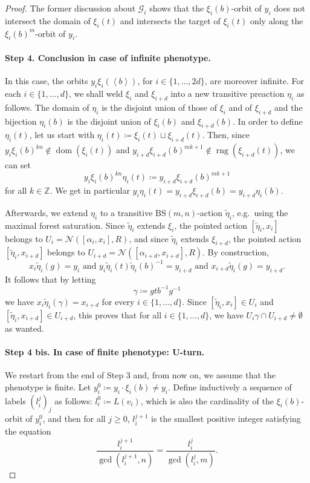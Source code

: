 \documentclass[12pt]{article}
\numberwithin{equation}{section}
\theoremstyle{definition}
\DeclareMathOperator{\dom}{\mathrm{dom}}
\DeclareMathOperator{\rng}{\mathrm{rng}}
\newcommand{\Z}{\mathbb{Z}}
\newcommand{\inv}{^{-1}}
\newcommand{\la}{\left\langle}
\newcommand{\ra}{\right\rangle}
\newcommand{\Gc}{\mathcal{G}}
\newcommand{\Nc}{\mathcal{N}}
\newcommand\BSo{\mathrm{BS}}
\begin{document}
\begin{proof}
    The former discussion about $\Gc_i$ shows that
    the $\xi_i(b)$-orbit of $y_i$ does not intersect the domain of $\xi_i(t)$ 
    and intersects the target of $\xi_i(t)$ only along the $\xi_i(b)^{m}$-orbit of $y_i$.
	
	\paragraph{Step 4. Conclusion in case of infinite phenotype.}
	
	In this case, the orbits $y_i \xi_i(\la b \ra)$, for $i\in \{1, \ldots, 2d\}$, are moreover infinite.
	For each $i\in \{1, \ldots, d\}$,
	we shall weld $\xi_i$ and $\xi_{i+d}$ into a new transitive preaction $\eta_i$ as follows.
	The domain of $\eta_i$ is the disjoint union of those of $\xi_i$ and of $\xi_{i+d}$ and
	the bijection $\eta_i(b)$ is the disjoint union of $\xi_i(b)$ and $\xi_{i+d}(b)$.
	In order to define $\eta_i(t)$, let us start with $\eta_i(t) \coloneqq \xi_{i}(t) \sqcup \xi_{i+d}(t)$.
	Then, since $y_i\xi_i(b)^{kn}\notin \dom(\xi_i(t))$ and $y_{i+d}\xi_{i+d}(b)^{mk+1} \notin \rng(\xi_{i+d}(t))$, we can set
	\[
	    y_i\xi_i(b)^{kn}\eta_i(t)\coloneqq y_{i+d}\xi_{i+d}(b)^{mk+1}
	\] 
	for all $k\in\Z$.
	We get in particular $y_i\eta_i(t)=y_{i+d}\xi_{i+d}(b)=y_{i+d}\eta_i(b)$.
	
	Afterwards, we extend $\eta_i$ to a transitive \( \BSo(m,n)  \)-action $\tilde \eta_i$, e.g.\ using the maximal forest saturation.
	Since $\tilde \eta_i$ extends $\xi_i$, the pointed action $[\tilde \eta_i,x_i]$ belongs to $U_i = \Nc([\alpha_i,x_i],R)$, 
	and since $\tilde \eta_i$ extends $\xi_{i+d}$, the pointed action $[\tilde \eta_i,x_{i+d}]$ belongs to $U_{i+d} = \Nc([\alpha_{i+d},x_{i+d}],R)$.
	By construction, 
	\[
	x_i\tilde\eta_i(g)=y_i
	\text{ and } y_i\tilde\eta_i(t)\tilde\eta_i(b)\inv=y_{i+d}\text{ and }x_{i+d}\tilde\eta_i(g)=y_{i+d}.
	\]
	It follows that by letting 
	\[
	\gamma \coloneqq g tb\inv g\inv
	\] 
	we have $x_i\tilde \eta_i(\gamma)=x_{i+d}$ for every $i\in\{1,\dots,d\}$.
	Since $[\tilde \eta_i,x_i]\in U_i$ and $[\tilde \eta_i,x_{i+d}]\in U_{i+d}$, this proves that for all $i\in\{1,\dots,d\}$, we have $U_i\gamma\cap U_{i+d}\neq\emptyset$ as wanted.
	
	
	
	
	\paragraph{Step 4 bis. In case of finite phenotype: U-turn.}
	We restart from the end of Step 3 and, from now on, we assume that the phenotype is finite.
	Let $y_i^0\coloneqq y_i\cdot \xi_i(b)\neq y_i$.
	Define inductively a sequence of labels $(l^j_i)_j$ as follows:  $l^0_i \coloneqq L(v_i)$, 
	which is also the cardinality of the $\xi_i(b)$-orbit  of $y_i^0$,
	and then for all $j\geq 0$, $l^{j+1}_i$ is the smallest positive integer satisfying the equation   
	\begin{equation}\label{eq: transfer yj - y j+1}
		\frac{l_i^{j+1}}{\gcd(l_i^{j+1},n)}=\frac{l_i^{j}}{\gcd(l_i^j,m)}.
	\end{equation}


\end{proof}
\end{document}
